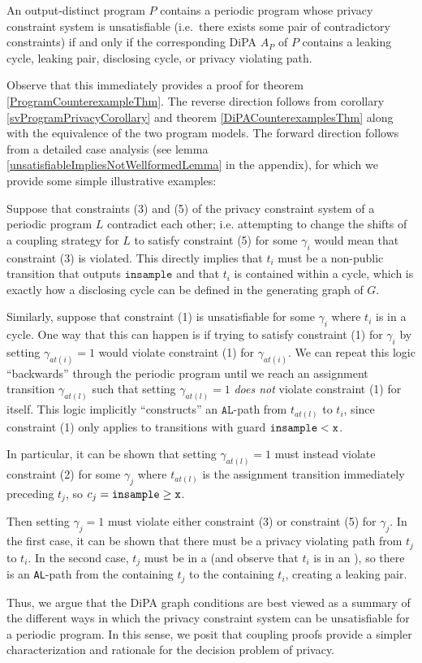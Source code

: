 \begin{thm}
    An output-distinct program $P$ contains a periodic program whose privacy constraint system is unsatisfiable (i.e.\ there exists some pair of contradictory constraints) if and only if the corresponding DiPA $A_P$ of $P$ contains a leaking cycle, leaking pair, disclosing cycle, or privacy violating path.
\end{thm}

Observe that this immediately provides a proof for theorem \ref{ProgramCounterexampleThm}. The reverse direction follows from corollary \ref{svProgramPrivacyCorollary} and theorem \ref{DiPACounterexamplesThm} along with the equivalence of the two program models.
The forward direction follows from a detailed case analysis (see lemma \ref{unsatisfiableImpliesNotWellformedLemma} in the appendix), for which we provide some simple illustrative examples:

Suppose that constraints (3) and (5) of the privacy constraint system of a periodic program $L$ contradict each other; i.e. attempting to change the shifts of a coupling strategy for $L$ to satisfy constraint (5) for some $\gamma_i$ would mean that constraint (3) is violated. This directly implies that $t_i$ must be a non-public transition that outputs $\texttt{insample}$ and that $t_i$ is contained within a cycle, which is exactly how a disclosing cycle can be defined in the generating graph of $G$. 

Similarly, suppose that constraint (1) is unsatisfiable for some $\gamma_i$ where $t_i$ is in a cycle. 
One way that this can happen is if trying to satisfy constraint (1) for $\gamma_i$ by setting $\gamma_{at(i)} = 1$ would violate constraint (1) for $\gamma_{at(i)}$. We can repeat this logic ``backwards'' through the periodic program until we reach an assignment transition $\gamma_{at(l)}$ such that setting $\gamma_{at(l)}=1$ \textit{does not} violate constraint (1) for itself. 
This logic implicitly ``constructs'' an $\texttt{AL}$-path from $t_{at(l)}$ to $t_i$, since constraint (1) only applies to transitions with guard $\lguard[\texttt{x}]$. 

In particular, it can be shown that setting $\gamma_{at(l)}=1$ must instead violate constraint (2) for some $\gamma_j$ where $t_{at(l)}$ is the assignment transition immediately preceding $t_j$, so $c_j = \gguard[\texttt{x}]$. 

Then setting $\gamma_{j}= 1$ must violate either constraint (3) or constraint (5) for $\gamma_{j}$. In the first case, it can be shown that there must be a privacy violating path from $t_j$ to $t_i$. In the second case, $t_{j}$ must be in a \gcycle (and observe that $t_i$ is in an \lcycle), so there is an \texttt{AL}-path from the \gcycle containing $t_j$ to the \lcycle containing $t_i$, creating a leaking pair. 

Thus, we argue that the DiPA graph conditions are best viewed as a summary of the different ways in which the privacy constraint system can be unsatisfiable for a periodic program. In this sense, we posit that coupling proofs provide a simpler characterization and rationale for the decision problem of privacy. 

